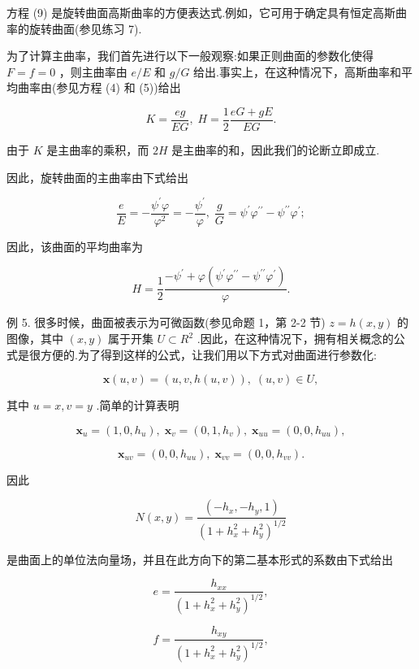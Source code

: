 方程 (9) 是旋转曲面高斯曲率的方便表达式.例如，它可用于确定具有恒定高斯曲率的旋转曲面(参见练习 7).

为了计算主曲率，我们首先进行以下一般观察:如果正则曲面的参数化使得 \(F = f = 0\) ，则主曲率由 \(e/E\) 和 \(g/G\) 给出.事实上，在这种情况下，高斯曲率和平均曲率由(参见方程 (4) 和 (5))给出

\[
K = \frac{eg}{EG},\;H = \frac{1}{2}\frac{{eG} + {gE}}{EG}.
\]

由于 \(K\) 是主曲率的乘积，而 \({2H}\) 是主曲率的和，因此我们的论断立即成立.

因此，旋转曲面的主曲率由下式给出

\[
\frac{e}{E} =  - \frac{{\psi }^{\prime }\varphi }{{\varphi }^{2}} =  - \frac{{\psi }^{\prime }}{\varphi },\;\frac{g}{G} = {\psi }^{\prime }{\varphi }^{\prime \prime } - {\psi }^{\prime \prime }{\varphi }^{\prime }; \tag{10}
\]

因此，该曲面的平均曲率为

\[
H = \frac{1}{2}\frac{-{\psi }^{\prime } + \varphi \left( {{\psi }^{\prime }{\varphi }^{\prime \prime } - {\psi }^{\prime \prime }{\varphi }^{\prime }}\right) }{\varphi }. \tag{11}
\]

例 5. 很多时候，曲面被表示为可微函数(参见命题 1，第 2-2 节) \(z = h\left( {x,y}\right)\) 的图像，其中 \(\left( {x,y}\right)\) 属于开集 \(U \subset  {R}^{2}\) .因此，在这种情况下，拥有相关概念的公式是很方便的.为了得到这样的公式，让我们用以下方式对曲面进行参数化:

\[
\mathbf{x}\left( {u,v}\right)  = \left( {u,v,h\left( {u,v}\right) }\right) ,\;\left( {u,v}\right)  \in  U,
\]

其中 \(u = x,v = y\) .简单的计算表明

\[
{\mathbf{x}}_{u} = \left( {1,0,{h}_{u}}\right) ,\;{\mathbf{x}}_{v} = \left( {0,1,{h}_{v}}\right) ,\;{\mathbf{x}}_{uu} = \left( {0,0,{h}_{uu}}\right) ,
\]

\[
{\mathbf{x}}_{uv} = \left( {0,0,{h}_{uu}}\right) ,\;{\mathbf{x}}_{vv} = \left( {0,0,{h}_{vv}}\right) .
\]

因此

\[
N\left( {x,y}\right)  = \frac{\left( -{h}_{x}, - {h}_{y},1\right) }{{\left( 1 + {h}_{x}^{2} + {h}_{y}^{2}\right) }^{1/2}}
\]

是曲面上的单位法向量场，并且在此方向下的第二基本形式的系数由下式给出

\[
e = \frac{{h}_{xx}}{{\left( 1 + {h}_{x}^{2} + {h}_{y}^{2}\right) }^{1/2}},
\]

\[
f = \frac{{h}_{xy}}{{\left( 1 + {h}_{x}^{2} + {h}_{y}^{2}\right) }^{1/2}},
\]


